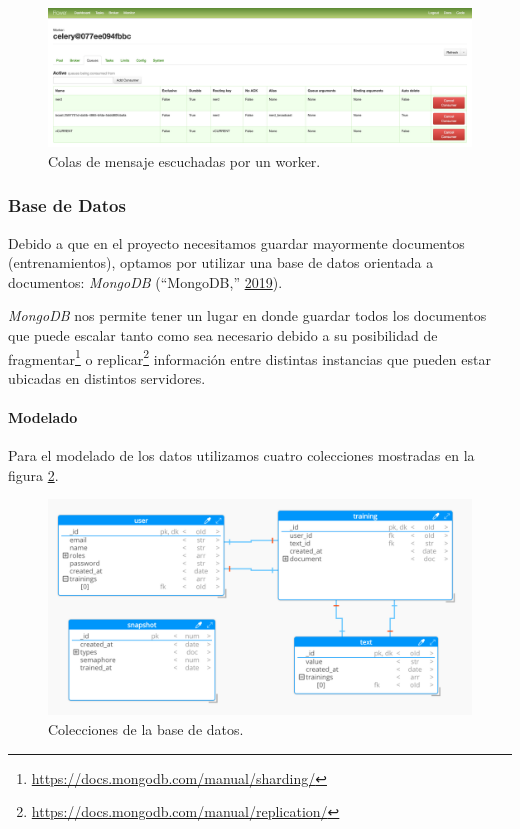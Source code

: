 \documentclass[12pt,a4paper,]{scrartcl}
\let\oldparagraph\paragraph
\renewcommand{\paragraph}[1]{\oldparagraph{#1}\mbox{}}
\begin{document}
\begin{figure}[H]

{\centering \includegraphics{assets/developer/flower-worker-queues.png} 

}

\caption{Colas de mensaje escuchadas por un worker.}\label{fig:developer-flower-worker-queues}
\end{figure}

\hypertarget{MongoDBDev}{%
\subsubsection{Base de Datos}\label{MongoDBDev}}

Debido a que en el proyecto necesitamos guardar mayormente documentos (entrenamientos), optamos por utilizar una base de datos orientada a documentos: \emph{MongoDB} (``MongoDB,'' \protect\hyperlink{ref-mongodb}{2019}).

\emph{MongoDB} nos permite tener un lugar en donde guardar todos los documentos que puede escalar tanto como sea necesario debido a su posibilidad de fragmentar\footnote{\url{https://docs.mongodb.com/manual/sharding/}} o replicar\footnote{\url{https://docs.mongodb.com/manual/replication/}} información entre distintas instancias que pueden estar ubicadas en distintos servidores.

\hypertarget{modelado}{%
\paragraph{Modelado}\label{modelado}}

Para el modelado de los datos utilizamos cuatro colecciones mostradas en la figura \ref{fig:developer-db-overview}.

\begin{figure}[H]

{\centering \includegraphics{assets/developer/db-overview.pdf} 

}

\caption{Colecciones de la base de datos.}\label{fig:developer-db-overview}
\end{figure}
\end{document}
